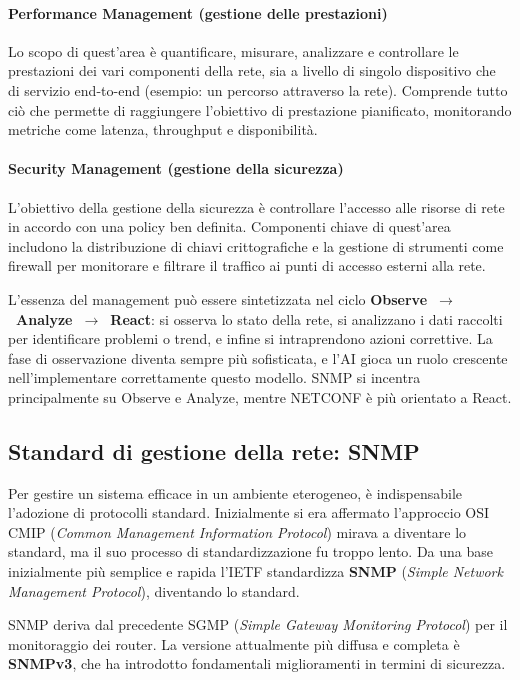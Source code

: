 \paragraph{Performance Management (gestione delle prestazioni)}

Lo scopo di quest'area è quantificare, misurare, analizzare e controllare le
prestazioni dei vari componenti della rete, sia a livello di singolo dispositivo
che di servizio end-to-end (esempio: un percorso attraverso la rete). Comprende
tutto ciò che permette di raggiungere l'obiettivo di prestazione pianificato,
monitorando metriche come latenza, throughput e disponibilità.

\paragraph{Security Management (gestione della sicurezza)}

L'obiettivo della gestione della sicurezza è controllare l'accesso alle risorse
di rete in accordo con una policy ben definita. Componenti chiave di quest'area
includono la distribuzione di chiavi crittografiche e la gestione di strumenti
come firewall per monitorare e filtrare il traffico ai punti di accesso esterni
alla rete.

L'essenza del management può essere sintetizzata nel ciclo
\textbf{Observe~$\to$~Analyze~$\to$~React}: si osserva lo stato della rete,
si analizzano i dati raccolti per identificare problemi o trend, e infine si
intraprendono azioni correttive.
La fase di osservazione diventa sempre più sofisticata, e l'AI gioca un ruolo
crescente nell'implementare correttamente questo modello.
SNMP si incentra principalmente su Observe e Analyze, mentre NETCONF è più 
orientato a React.

\subsection{Standard di gestione della rete: SNMP}

Per gestire un sistema efficace in un ambiente eterogeneo, è indispensabile
l'adozione di protocolli standard. Inizialmente si era affermato l'approccio OSI
CMIP (\textit{Common Management Information Protocol}) mirava a diventare lo
standard, ma il suo processo di standardizzazione fu troppo lento.
Da una base inizialmente più semplice e rapida l'IETF standardizza \textbf{SNMP} 
(\textit{Simple Network Management Protocol}), diventando lo standard.

SNMP deriva dal precedente SGMP (\textit{Simple Gateway Monitoring Protocol}) 
per il monitoraggio dei router.
La versione attualmente più diffusa e completa è \textbf{SNMPv3}, che ha 
introdotto fondamentali miglioramenti in termini di sicurezza.

